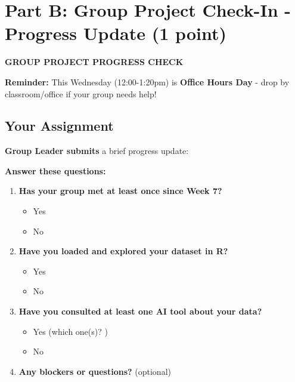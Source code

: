 \documentclass[10pt]{article}
\begin{document}
\section*{Part B: Group Project Check-In - Progress Update (1 point)}

\begin{tcolorbox}[colback=aiblue!10,colframe=aiblue,boxrule=1pt,arc=2pt,left=6pt,right=6pt,top=6pt,bottom=6pt]
\textbf{GROUP PROJECT PROGRESS CHECK}
\end{tcolorbox}

\vspace{4pt}

\textbf{Reminder:} This Wednesday (12:00-1:20pm) is \textbf{Office Hours Day} - drop by classroom/office if your group needs help!

\subsection*{Your Assignment}

\textbf{Group Leader submits} a brief progress update:

\textbf{Answer these questions:}

\begin{enumerate}
\item \textbf{Has your group met at least once since Week 7?}
\begin{itemize}[label=$\square$]
\item Yes
\item No
\end{itemize}

\item \textbf{Have you loaded and explored your dataset in R?}
\begin{itemize}[label=$\square$]
\item Yes
\item No
\end{itemize}

\item \textbf{Have you consulted at least one AI tool about your data?}
\begin{itemize}[label=$\square$]
\item Yes (which one(s)? \underline{\hspace{3cm}})
\item No
\end{itemize}

\item \textbf{Any blockers or questions?} (optional)\\[4pt]
\underline{\hspace{\textwidth}}\\[2pt]
\underline{\hspace{\textwidth}}
\end{enumerate}
\end{document}
